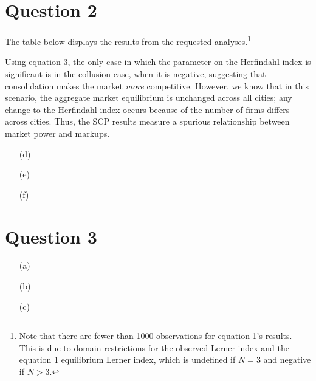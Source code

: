 \documentclass{article}
\begin{document}
\section*{Question 2}
The table below displays the results from the requested analyses.\footnote{Note that there are fewer than 1000 observations for equation 1's results. This is due to domain restrictions for the observed Lerner index and the equation 1 equilibrium Lerner index, which is undefined if ${N=3}$ and negative if ${N>3}$.}
\begin{center}
  
\end{center}
Using equation 3, the only case in which the parameter on the Herfindahl index is significant is in the collusion case, when it is negative, suggesting that consolidation makes the market \textit{more} competitive. However, we know that in this scenario, the aggregate market equilibrium is unchanged across all cities; any change to the Herfindahl index occurs because of the number of firms differs across cities. Thus, the SCP results measure a spurious relationship between market power and markups.
\begin{itemize}
    \item[(d)]
    \item[(e)]
    \item[(f)]
\end{itemize}


\section*{Question 3}
\begin{itemize}
    \item[(a)]
    \item[(b)]
    \item[(c)]
\end{itemize}

\end{document}

